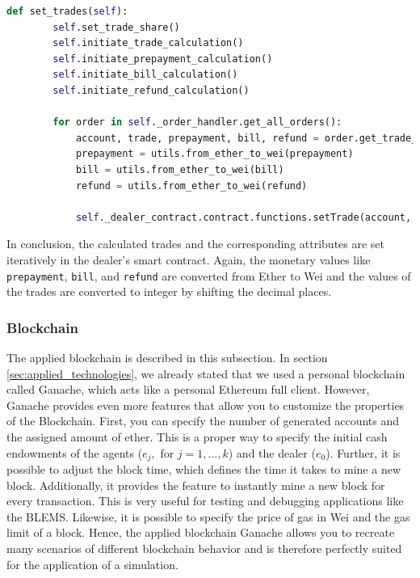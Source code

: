 \begin{lstlisting}[float=htbp, label=lst:offchain_set_trades, caption=Setting of Trades in Smart Contract Dealer, language=Python]
    def set_trades(self):
        self.set_trade_share()
        self.initiate_trade_calculation()
        self.initiate_prepayment_calculation()
        self.initiate_bill_calculation()
        self.initiate_refund_calculation()

        for order in self._order_handler.get_all_orders():
            account, trade, prepayment, bill, refund = order.get_trade_information()
            prepayment = utils.from_ether_to_wei(prepayment)
            bill = utils.from_ether_to_wei(bill)
            refund = utils.from_ether_to_wei(refund)

            self._dealer_contract.contract.functions.setTrade(account, trade, prepayment, bill, refund).transact({'from': self._account_address})
\end{lstlisting}

In conclusion, the calculated trades and the corresponding attributes are set iteratively in the dealer's smart contract. 
Again, the monetary values like \verb|prepayment|, \verb|bill|, and \verb|refund| are converted from Ether to Wei and 
the values of the trades are converted to integer by shifting the decimal places.

\subsubsection{Blockchain}
The applied blockchain is described in this subsection. In section \ref{sec:applied_technologies}, we already
stated that we used a personal blockchain called Ganache, which acts like a personal Ethereum full client.
However, Ganache provides even more features that allow you to customize the properties of the Blockchain.
First, you can specify the number of generated accounts and the assigned amount of ether.
This is a proper way to specify the initial cash endowments of the agents ($e_{j},$ for $j=1, ..., k$)
and the dealer ($e_{0}$).
Further, it is possible to adjust the block time, which defines the time it takes to mine a new block. 
Additionally, it provides the feature to instantly mine a new block for every transaction. 
This is very useful for testing and debugging applications like the BLEMS.
Likewise, it is possible to specify the price of gas in Wei and the gas limit of a block. 
Hence, the applied blockchain Ganache allows you to recreate many scenarios of different blockchain behavior
and is therefore perfectly suited for the application of a simulation.


